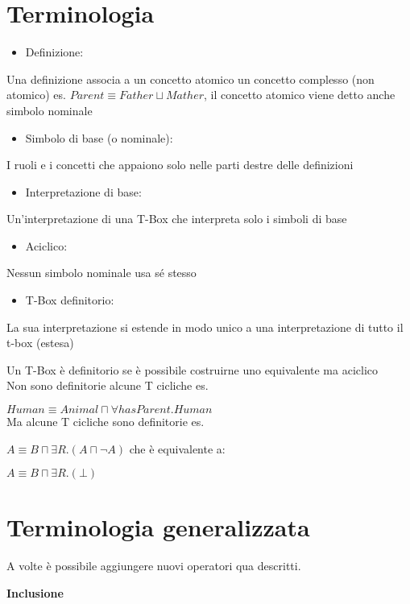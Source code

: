 \section{Terminologia}
\begin{itemize}
\item Definizione: 
\end{itemize}
Una definizione associa a un concetto atomico un concetto complesso
(non atomico) es. $Parent\equiv Father\sqcup Mather$, il concetto
atomico viene detto anche simbolo nominale
\begin{itemize}
\item Simbolo di base (o nominale):
\end{itemize}
I ruoli e i concetti che appaiono solo nelle parti destre delle definizioni
\begin{itemize}
\item Interpretazione di base:
\end{itemize}
Un'interpretazione di una T-Box che interpreta solo i simboli di base
\begin{itemize}
\item Aciclico:
\end{itemize}
Nessun simbolo nominale usa sé stesso
\begin{itemize}
\item T-Box definitorio:
\end{itemize}
La sua interpretazione si estende in modo unico a una interpretazione
di tutto il t-box (estesa)

Un T-Box è definitorio se è possibile costruirne uno equivalente ma
aciclico\\


Non sono definitorie alcune T cicliche es.

$Human\equiv Animal\sqcap\forall hasParent.Human$\\


Ma alcune T cicliche sono definitorie es.

$A\equiv B\sqcap\exists R.(A\sqcap\neg A)$ che è equivalente a:

$A\equiv B\sqcap\exists R.(\bot)$ 


\section{Terminologia generalizzata}

A volte è possibile aggiungere nuovi operatori qua descritti.

\textbf{Inclusione}

